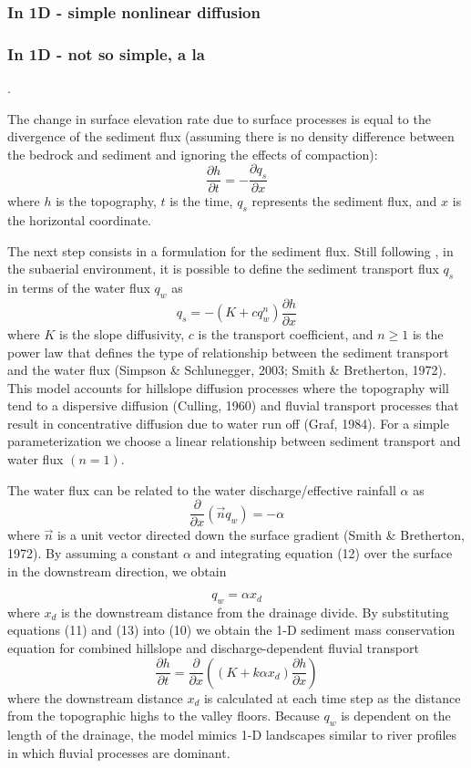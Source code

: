 \subsubsection{In 1D - simple nonlinear diffusion} 

\cite{bucl97}


\subsubsection{In 1D - not so simple, a la \cite{anpa19}}. 

The change in surface elevation rate due to surface processes is equal
to the divergence of the sediment flux 
(assuming there is no density difference between the bedrock and
sediment and ignoring the effects of compaction):
\[
\frac{\partial h}{\partial t} = -\frac{\partial q_s}{\partial x}
\]
where $h$ is the topography, $t$ is the time, $q_s$ represents the sediment flux, 
and $x$ is the horizontal coordinate. 

The next step consists in a formulation for the sediment flux. Still following \cite{anpa19}, 
in the subaerial environment, it is possible to define the sediment transport 
flux $q_s$ in terms of the water flux $q_w$ as
\[
q_s=-(K+c q_w^n) \frac{\partial h}{\partial x}
\]
where $K$ is the slope diffusivity, $c$ is the transport coefficient, 
and $n \geq 1$ is the power law that defines the type
of relationship between the sediment transport and the water flux 
(Simpson \& Schlunegger, 2003; Smith \& Bretherton, 1972).
This model accounts for hillslope diffusion processes where the topography will tend to
a dispersive diffusion (Culling, 1960) and fluvial transport processes that result in concentrative diffusion
due to water run off (Graf, 1984). For a simple parameterization we choose a linear relationship between
sediment transport and water flux $(n=1)$.

The water flux can be related to the water discharge/effective rainfall $\alpha$ as
\[
\frac{\partial}{\partial x} (\vec{n} q_w) = -\alpha
\]
where $\vec n$ is a unit vector directed down the surface gradient (Smith \& Bretherton, 1972). 
By assuming a constant $\alpha$ and integrating equation (12) over the surface in the downstream direction, we obtain

\[
q_w = \alpha x_d
\]
where $x_d$ is the downstream distance from the drainage divide. By substituting equations (11) and
(13) into (10) we obtain the 1-D sediment mass conservation equation for combined hillslope and
discharge-dependent fluvial transport
\[
\frac{\partial h}{\partial t} = \frac{\partial}{\partial x} \left( (K+k \alpha x_d) 
\frac{\partial h}{\partial x}   \right)
\]
where the downstream distance $x_d$ is calculated at each time step as the distance from the topographic highs
to the valley floors. Because $q_w$ is dependent on the length of the drainage, the model mimics 1-D landscapes
similar to river profiles in which fluvial processes are dominant.

